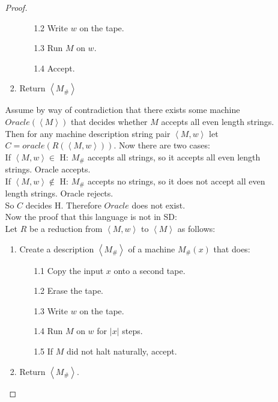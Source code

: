 \documentclass[10pt]{article}
\newcommand{\card}[1]{\left| #1 \right|}
\newcommand{\brackets}[1]{\left< #1 \right>}
\begin{document}
\begin{enumerate}[1)]
\begin{enumerate}[a)]
\begin{proof}[Proof]
\begin{enumerate}[1.]
\begin{enumerate}
\item[1.2]
Write $w$ on the tape.

\item[1.3]
Run $M$ on $w$.

\item[1.4]
Accept.
\end{enumerate}
\item
Return $\brackets{M_\#}$
\end{enumerate}

Assume by way of contradiction that there exists some machine $Oracle(\brackets{M})$ that decides whether $M$ accepts all even length strings.  Then for any machine description string pair $\brackets{M, w}$ let $C = oracle(R(\brackets{M, w}))$. Now there are two cases:\\

If $\brackets{M, w} \in$ H: $M_\#$ accepts all strings, so it accepts all even length strings.  Oracle accepts.\\
If $\brackets{M, w} \not \in$ H: $M_\#$ accepts no strings, so it does not accept all even length strings.  Oracle rejects.\\

So $C$ decides H.  Therefore $Oracle$ does not exist.\\

\vspace{1cm}
\noindent
Now the proof that this language is not in SD:\\
Let $R$ be a reduction from $\brackets{M, w}$ to $\brackets{M}$ as follows:
\begin{enumerate}[1.]
\item
Create a description $\brackets{M_\#}$ of a machine $M_\#(x)$ that does:
\begin{enumerate}
\item[1.1]
Copy the input $x$ onto a second tape.

\item[1.2]
Erase the tape.

\item[1.3]
Write $w$ on the tape.

\item[1.4]
Run $M$ on $w$ for $\card{x}$ steps.

\item[1.5]
If $M$ did not halt naturally, accept.
\end{enumerate}
\item
Return $\brackets{M_\#}$.
\end{enumerate}


\end{proof}
\end{enumerate}
\end{enumerate}
\end{document}
